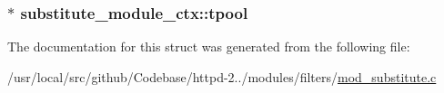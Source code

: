 \subsubsection[{\texorpdfstring{tpool}{tpool}}]{$\ast$ substitute\+\_\+module\+\_\+ctx\+::tpool}\hypertarget{structsubstitute__module__ctx_a61347677e01457caf41af3399480c132}{}\label{structsubstitute__module__ctx_a61347677e01457caf41af3399480c132}


The documentation for this struct was generated from the following file\+:\begin{DoxyCompactItemize}
\item 
/usr/local/src/github/\+Codebase/httpd-\/2../modules/filters/\hyperlink{mod__substitute_8c}{mod\+\_\+substitute.\+c}\end{DoxyCompactItemize}
